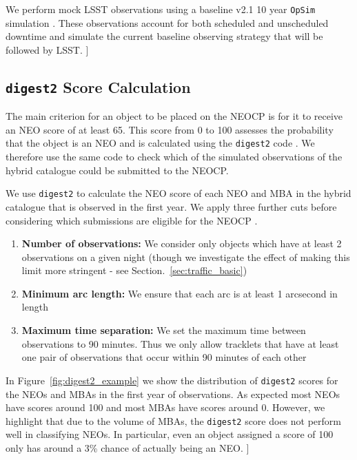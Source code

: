 \documentclass[twocolumn]{aastex631}
\newcommand{\todo}[1]{{\color{red}{[TODO: #1}]}}
\newcommand{\needcite}{{\color{magenta}{(needs citation)}}}
\newcommand{\dig}{\texttt{digest2}}
\begin{document}
We perform mock LSST observations using a baseline v2.1 10 year \texttt{OpSim} simulation \citep{Bianco+2022}. These observations account for both scheduled and unscheduled downtime and simulate the current baseline observing strategy that will be followed by LSST. \todo{Mario should check this (and the citation)}

\subsection{\dig{} Score Calculation}\label{sec:digest2_score}
The main criterion for an object to be placed on the NEOCP is for it to receive an NEO score of at least 65. This score from 0 to 100 assesses the probability that the object is an NEO and is calculated using the \dig{} code \citep{Keys+2019}. We therefore use the same code to check which of the simulated observations of the hybrid catalogue could be submitted to the NEOCP.

We use \dig{} to calculate the NEO score of each NEO and MBA in the hybrid catalogue that is observed in the first year. We apply three further cuts before considering which submissions are eligible for the NEOCP \needcite{}.
\begin{enumerate}
    \item \textbf{Number of observations:} We consider only objects which have at least 2 observations on a given night (though we investigate the effect of making this limit more stringent - see Section.~\ref{sec:traffic_basic})
    \item \textbf{Minimum arc length:} We ensure that each arc is at least 1 arcsecond in length
    \item \textbf{Maximum time separation:} We set the maximum time between observations to 90 minutes. Thus we only allow tracklets that have at least one pair of observations that occur within 90 minutes of each other
\end{enumerate}

In Figure~\ref{fig:digest2_example} we show the distribution of \dig{} scores for the NEOs and MBAs in the first year of observations. As expected most NEOs have scores around 100 and most MBAs have scores around 0. However, we highlight that due to the volume of MBAs, the \dig{} score does not perform well in classifying NEOs. In particular, even an object assigned a score of 100 only has around a 3\% chance of actually being an NEO. \todo{not sure if this is right place}
\end{document}
